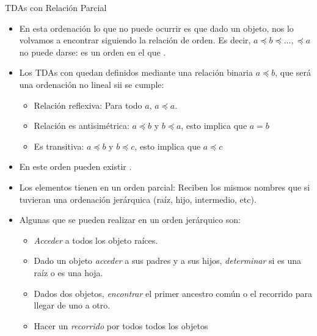 \documentclass[10pt,envcountsect,spanish]{beamer}
\begin{document}
\begin{frame}{TDAs con Relación Parcial}

\begin{itemize}

\item En esta ordenación lo que no puede ocurrir es que dado un objeto, nos lo volvamos a encontrar siguiendo la relación de orden. Es decir, $a\preceq b\preceq \ldots, \preceq a $ no puede darse: es un orden en el que .


\item Los TDAs con  quedan definidos mediante una relación binaria $a\preceq b$, que será una ordenación no lineal sii se cumple:
\begin{itemize}
\item Relación reflexiva: Para todo $a$, $a\preceq a$.
\item Relación es antisimétrica:  $a\preceq b$ y $b\preceq a$, esto implica que $a=b$
\item Es transitiva:  $a\preceq b$ y $b\preceq c$, esto implica que $a\preceq c$
\end{itemize}

\item En este orden  pueden existir . 


\item Los elementos tienen  en un orden parcial: Reciben los mismos nombres que si tuvieran una ordenación jerárquica (raíz, hijo, intermedio, etc).


\item Algunas  que se pueden realizar en un orden jerárquico son:

\begin{itemize}
\item \textit{Acceder} a todos los objeto raíces.
\item Dado un objeto \textit{acceder} a sus padres y a sus hijos, \textit{determinar} si es una raíz o es una hoja.
\item Dados dos objetos, \textit{encontrar} el primer ancestro común o el recorrido para llegar de uno a otro.
\item Hacer un \textit{recorrido} por todos todos los objetos
\end{itemize}

\end{itemize}

\end{frame}
\end{document}

